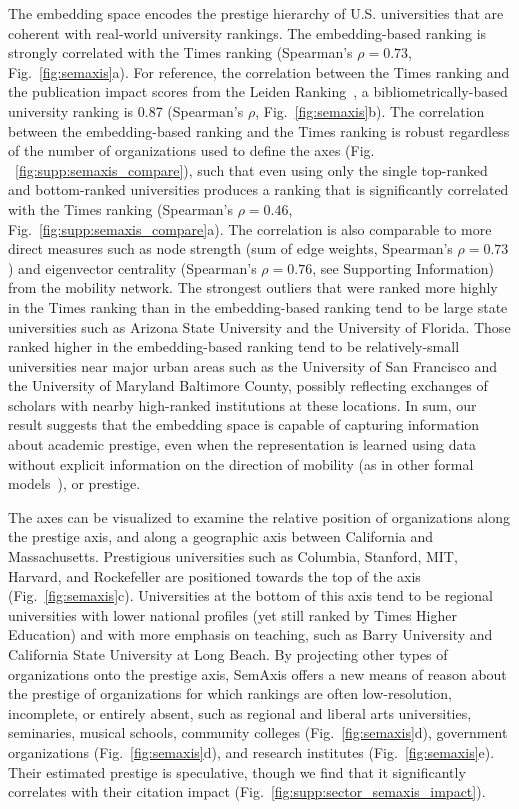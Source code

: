 \documentclass[12pt]{article} %
\def\SI{Supporting Information}
\begin{document}
The embedding space encodes the prestige hierarchy of U.S. universities that are coherent with real-world university rankings.
The embedding-based ranking is strongly correlated with the Times ranking (Spearman's $\rho = 0.73$, Fig.~\ref{fig:semaxis}a).
For reference, the correlation between the Times ranking and the publication impact scores from the Leiden Ranking~\autocite{waltman2012leidenrankings}, a bibliometrically-based university ranking is 0.87 (Spearman's $\rho$, Fig.~\ref{fig:semaxis}b).
The correlation between the embedding-based ranking and the Times ranking is robust regardless of the number of organizations used to define the axes (Fig. ~\ref{fig:supp:semaxis_compare}), such that even using only the single top-ranked and bottom-ranked universities produces a ranking that is significantly correlated with the Times ranking (Spearman's $\rho = 0.46$, Fig.~\ref{fig:supp:semaxis_compare}a).
The correlation is also comparable to more direct measures such as node strength (sum of edge weights, Spearman's $\rho = 0.73$) and eigenvector centrality (Spearman's $\rho = 0.76$, see \SI) from the mobility network. 
The strongest outliers that were ranked more highly in the Times ranking than in the embedding-based ranking tend to be large state universities such as Arizona State University and the University of Florida.
Those ranked higher in the embedding-based ranking tend to be relatively-small universities near major urban areas such as the University of San Francisco and the University of Maryland Baltimore County, possibly reflecting exchanges of scholars with nearby high-ranked institutions at these locations.
In sum, our result suggests that the embedding space is capable of capturing information about academic prestige, even when the representation is learned using data without explicit information on the direction of mobility (as in other formal models~\autocite{clauset2015hierarchy}), or prestige. 


The axes can be visualized to examine the relative position of organizations along the prestige axis, and along a geographic axis between California and Massachusetts.
Prestigious universities such as Columbia, Stanford, MIT, Harvard, and Rockefeller are positioned towards the top of the axis (Fig.~\ref{fig:semaxis}c).
Universities at the bottom of this axis tend to be regional universities with lower national profiles (yet still ranked by Times Higher Education) and with more emphasis on teaching, such as Barry University and California State University at Long Beach.
By projecting other types of organizations onto the prestige axis, SemAxis offers a new means of reason about the prestige of organizations for which rankings are often low-resolution, incomplete, or entirely absent, such as regional and liberal arts universities, seminaries, musical schools, community colleges (Fig.~\ref{fig:semaxis}d), government organizations (Fig.~\ref{fig:semaxis}d), and research institutes (Fig.~\ref{fig:semaxis}e).
Their estimated prestige is speculative, though we find that it significantly correlates with their citation impact (Fig.~\ref{fig:supp:sector_semaxis_impact}). 
\end{document}
